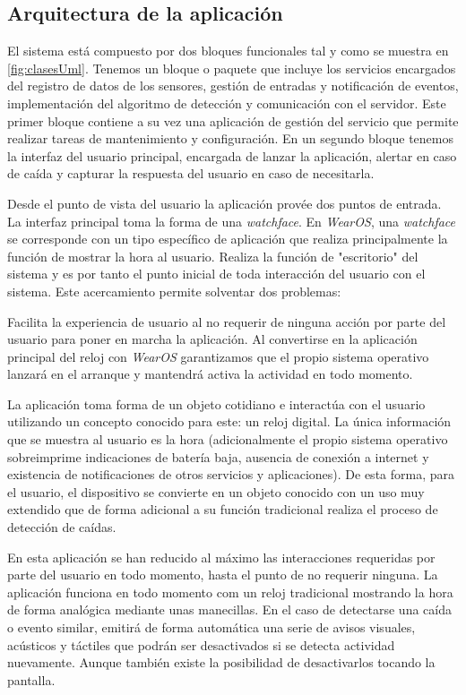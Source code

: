 \documentclass[../tfm.tex]{subfiles}
\begin{document}
\subsection{Arquitectura de la aplicación}

El sistema está compuesto por dos bloques funcionales tal y como se muestra en \ref{fig:clasesUml}. Tenemos un bloque o paquete que incluye los servicios encargados del registro de datos de los sensores, gestión de entradas y notificación de eventos, implementación del algoritmo de detección y comunicación con el servidor. Este primer bloque contiene a su vez una aplicación de gestión del servicio que permite realizar tareas de mantenimiento y configuración. En un segundo bloque tenemos la interfaz del usuario principal, encargada de lanzar la aplicación, alertar en caso de caída y capturar la respuesta del usuario en caso de necesitarla.


Desde el punto de vista del usuario la aplicación provée dos puntos de entrada. La interfaz principal toma la forma de una \textit{watchface}. En \textit{WearOS}, una \textit{watchface} se corresponde con un tipo específico de aplicación que realiza principalmente la función de mostrar la hora al usuario. Realiza la función de "escritorio" del sistema y es por tanto el punto inicial de toda interacción del usuario con el sistema. Este acercamiento permite solventar dos problemas:

Facilita la experiencia de usuario al no requerir de ninguna acción por parte del usuario para poner en marcha la aplicación. Al convertirse en la aplicación principal del reloj con  \textit{WearOS} garantizamos que el propio sistema operativo lanzará en el arranque y mantendrá activa la actividad en todo momento.

La aplicación toma forma de un objeto cotidiano e interactúa con el usuario utilizando un concepto conocido para este: un reloj digital. La única información que se muestra al usuario es la hora (adicionalmente el propio sistema operativo sobreimprime indicaciones de batería baja, ausencia de conexión a internet y existencia de notificaciones de otros servicios y aplicaciones). De esta forma, para el usuario, el dispositivo se convierte en un objeto conocido con un uso muy extendido que de forma adicional a su función tradicional realiza el proceso de detección de caídas.

En esta aplicación se han reducido al máximo las interacciones requeridas por parte del usuario en todo momento, hasta el punto de no requerir ninguna. La aplicación funciona en todo momento com un reloj tradicional mostrando la hora de forma analógica mediante unas manecillas. En el caso de detectarse una caída o evento similar, emitirá de forma automática una serie de avisos visuales, acústicos y táctiles que podrán ser desactivados si se detecta actividad nuevamente. Aunque también existe la posibilidad de desactivarlos tocando la pantalla.
\end{document}
